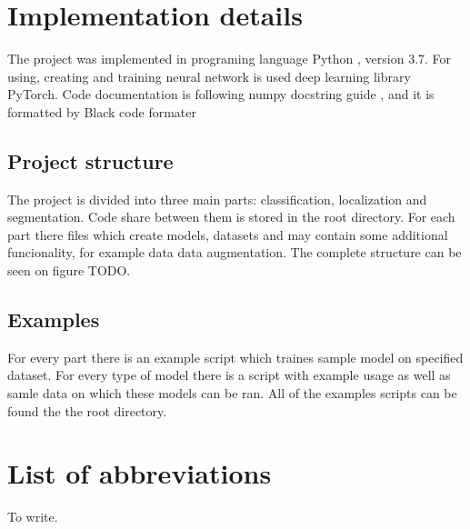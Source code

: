 \documentclass[twoside]{ctuthesis}
\theoremstyle{plain}
\theoremstyle{definition}
\theoremstyle{note}
\begin{document}
\chapter{Implementation details}
The project was implemented in programing language Python \cite{Python}, version 3.7.
For using, creating and training neural network is used deep learning library PyTorch\cite{PyTorch}.
Code documentation is following numpy docstring guide \cite{NP}, and it is formatted by Black code 
formater \cite{Black}


\section{Project structure}
The project is divided into three main parts: classification, localization and segmentation.
Code share between them is stored in the root directory. For each part there files which create
models, datasets and may contain some additional funcionality, for example data data augmentation.
The complete structure can be seen on figure TODO.

\section{Examples}
For every part there is an example script which traines sample model on specified dataset. For
every type of model there is a script with example usage as well as samle data on which these 
models can be ran. All of the examples scripts can be found the the root directory.


\chapter{List of abbreviations}
To write.

\printindex

\appendix




\end{document}

